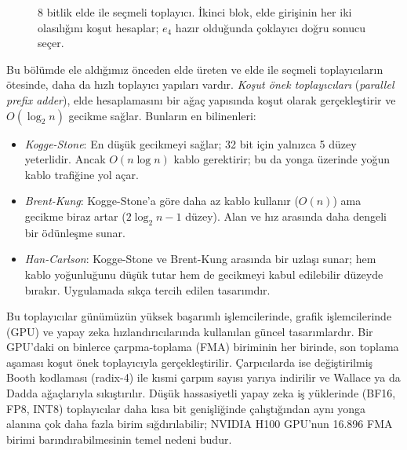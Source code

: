 \begin{figure}[htbp]
\caption[8 bitlik elde ile seçmeli toplayıcı]{8 bitlik elde ile seçmeli toplayıcı. İkinci blok, elde girişinin her iki olasılığını koşut hesaplar; $e_4$ hazır olduğunda çoklayıcı doğru sonucu seçer.}
\label{fig:carry-select-8bit}
\end{figure}

\begin{bilginot}
Bu bölümde ele aldığımız önceden elde üreten ve elde ile seçmeli toplayıcıların ötesinde, daha da hızlı toplayıcı yapıları vardır. \emph{Koşut önek toplayıcıları} (\emph{parallel prefix adder}), elde hesaplamasını bir ağaç yapısında koşut olarak gerçekleştirir ve $O(\log_2 n)$ gecikme sağlar. Bunların en bilinenleri:
\begin{itemize}
  \item \emph{Kogge-Stone}: En düşük gecikmeyi sağlar; 32 bit için yalnızca 5 düzey yeterlidir. Ancak $O(n \log n)$ kablo gerektirir; bu da yonga üzerinde yoğun kablo trafiğine yol açar.
  \item \emph{Brent-Kung}: Kogge-Stone'a göre daha az kablo kullanır ($O(n)$) ama gecikme biraz artar ($2\log_2 n - 1$ düzey). Alan ve hız arasında daha dengeli bir ödünleşme sunar.
  \item \emph{Han-Carlson}: Kogge-Stone ve Brent-Kung arasında bir uzlaşı sunar; hem kablo yoğunluğunu düşük tutar hem de gecikmeyi kabul edilebilir düzeyde bırakır. Uygulamada sıkça tercih edilen tasarımdır.
\end{itemize}
Bu toplayıcılar günümüzün yüksek başarımlı işlemcilerinde, grafik işlemcilerinde (GPU) ve yapay zeka hızlandırıcılarında kullanılan güncel tasarımlardır. Bir GPU'daki on binlerce çarpma-toplama (FMA) biriminin her birinde, son toplama aşaması koşut önek toplayıcıyla gerçekleştirilir. Çarpıcılarda ise değiştirilmiş Booth kodlaması (radix-4) ile kısmi çarpım sayısı yarıya indirilir ve Wallace ya da Dadda ağaçlarıyla sıkıştırılır. Düşük hassasiyetli yapay zeka iş yüklerinde (BF16, FP8, INT8) toplayıcılar daha kısa bit genişliğinde çalıştığından aynı yonga alanına çok daha fazla birim sığdırılabilir; NVIDIA H100 GPU'nun 16.896 FMA birimi barındırabilmesinin temel nedeni budur.
\end{bilginot}

